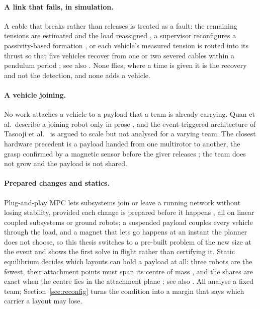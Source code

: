 \paragraph{A link that fails, in simulation.} A cable that breaks rather than releases is treated as a fault: the
remaining tensions are estimated and the load reassigned \cite{liang2021fault}, a supervisor reconfigures a
passivity-based formation \cite{saiella2021fault}, or each vehicle's measured tension is routed into its thrust so
that five vehicles recover from one or two severed cables within a pendulum period \cite{hajieghrary2026passive}; see
also \cite{farrasFaultTolerantControlMultiQuadcopter2024}. None flies, where a time is given it is the recovery and not
the detection, and none adds a vehicle.

\paragraph{A vehicle joining.} No work attaches a vehicle to a payload that a team is already carrying. Quan et al.\
describe a joining robot only in prose \cite{quan2025swarm}, and the event-triggered architecture of Tasooji et al.\
\cite{tasoojiCooperativeControlMultiQuadrotors} is argued to scale but not analysed for a varying team. The closest
hardware precedent is a payload handed from one multirotor to another, the grasp confirmed by a magnetic sensor before
the giver releases \cite{shankar2020inflight}; the team does not grow and the payload is not shared.

\paragraph{Prepared changes and statics.} Plug-and-play MPC lets subsystems join or leave a running network without
losing stability, provided each change is prepared before it happens \cite{riverso2013plug, zeilinger2013plug,
aboudonia2022reconfigurable, saccani2023model}, all on linear coupled subsystems or ground robots; a suspended payload
couples every vehicle through the load, and a magnet that lets go happens at an instant the planner does not choose, so
this thesis switches to a pre-built problem of the new size at the event and shows the first solve in flight rather
than certifying it. Static equilibrium decides which layouts can hold a payload at all: three robots are the fewest,
their attachment points must span its centre of mass \cite{michael2011cooperative, jiang2013inverse}, and the shares
are exact when the centre lies in the attachment plane \cite{tognon2018internal}; see also
\cite{gabellieri2023equilibria, liu2025wrench, fink2011planning}. All analyse a fixed team; Section~\ref{sec:reconfig}
turns the condition into a margin that says which carrier a layout may lose.

